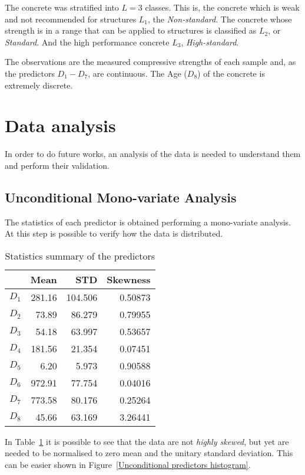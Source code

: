 \documentclass[conference]{IEEEtran}
\begin{document}
The concrete was stratified into $L=3$ classes\cite{article1}. This is, the concrete which is weak and not recommended for structures $L_1$, the \emph{Non-standard}. The concrete whose strength is in a range that can be applied to structures is classified as $L_2$, or \emph{Standard}. And the high performance concrete $L_3$, \emph{High-standard}.

The observations are the measured compressive strengths of each sample and, as the predictors $D_1 - D_7$, are continuous. The Age ($D_8$) of the concrete is extremely discrete.

\section{Data analysis}\label{data_analysis}

In order to do future works, an analysis of the data is needed to understand them and perform their validation.

\subsection{Unconditional Mono-variate Analysis}

The statistics of each predictor is obtained performing a mono-variate analysis. At this step is possible to verify how the data is distributed.

\begin{table}[htp]
\caption{Statistics summary of the predictors}
  \centering
  \begin{tabular}{@{} crrr @{}}
    \toprule
     & Mean & STD & Skewness \\ 
    \midrule
    $D_1$ & 281.16 & 104.506 & 0.50873 \\ 
    $D_2$ & 73.89 & 86.279 & 0.79955 \\ 
    $D_3$ & 54.18 & 63.997 & 0.53657 \\ 
    $D_4$ & 181.56 & 21.354 & 0.07451 \\ 
    $D_5$ & 6.20 & 5.973 & 0.90588 \\ 
    $D_6$ & 972.91 & 77.754 & 0.04016 \\ 
    $D_7$ & 773.58 & 80.176 & 0.25264 \\ 
    $D_8$ & 45.66 & 63.169 & 3.26441 \\       
    \bottomrule
  \end{tabular}
\label{statistics_table_alldataset}
\end{table}%

In Table~\ref{statistics_table_alldataset} it is possible to see that the data are not \emph{highly skewed}, but yet are needed to be normalised to zero mean and the unitary standard deviation. This can be easier shown in Figure~\ref{Unconditional predictors histogram}.
\end{document}
